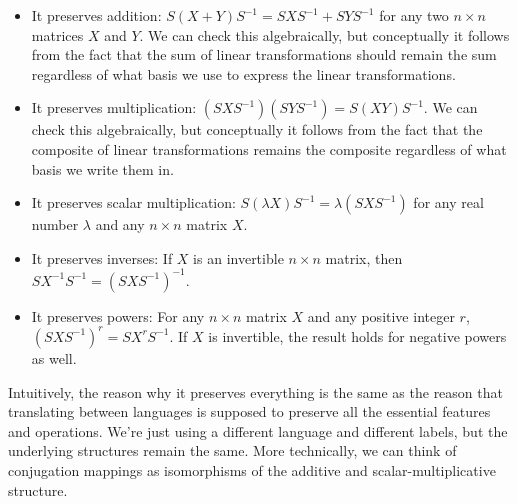 \documentclass[10pt]{amsart}
\begin{document}
\begin{itemize}
\item It preserves addition: $S(X + Y)S^{-1} = SXS^{-1} + SYS^{-1}$
  for any two $n \times n$ matrices $X$ and $Y$. We can check this
  algebraically, but conceptually it follows from the fact that the
  sum of linear transformations should remain the sum regardless of
  what basis we use to express the linear transformations.
\item It preserves multiplication: $(SXS^{-1})(SYS^{-1}) =
  S(XY)S^{-1}$. We can check this algebraically, but conceptually it
  follows from the fact that the composite of linear transformations
  remains the composite regardless of what basis we write them in.
\item It preserves scalar multiplication: $S(\lambda X)S^{-1} =
  \lambda (SXS^{-1})$ for any real number $\lambda$ and any $n \times
  n$ matrix $X$.
\item It preserves inverses: If $X$ is an invertible $n\times n$
  matrix, then $SX^{-1}S^{-1} = (SXS^{-1})^{-1}$.
\item It preserves powers: For any $n \times n$ matrix $X$ and any
  positive integer $r$, $(SXS^{-1})^r = SX^rS^{-1}$. If $X$ is
  invertible, the result holds for negative powers as well.
\end{itemize}

Intuitively, the reason why it preserves everything is the same as the
reason that translating between languages is supposed to preserve all
the essential features and operations. We're just using a different
language and different labels, but the underlying structures remain
the same. More technically, we can think of conjugation mappings as
isomorphisms of the additive and scalar-multiplicative structure.
\end{document}
